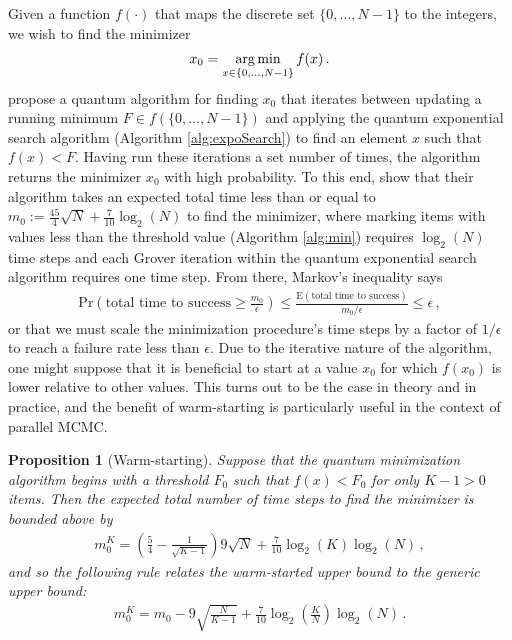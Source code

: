 \documentclass[12pt]{article} %
\newtheorem{prop}{Proposition}
\newcommand{\argmin}{\operatornamewithlimits{arg\,min}}
\begin{document}
Given a function $f(\cdot)$ that maps the discrete set $\{0,\dots,N-1\}$ to the integers, we wish to find the minimizer
\begin{align*}
x_0 = \argmin_{x\in\{0,\dots,N-1\}} f(x) \, .
\end{align*}
 \citet{durr1996quantum} propose a quantum algorithm for finding $x_0$ that iterates between updating a running minimum $F\in f(\{0,\dots,N-1\})$ and applying the quantum exponential search algorithm (Algorithm \ref{alg:expoSearch}) to find an element $x$ such that $f(x)<F$.  Having run these iterations a set number of times, the algorithm returns the minimizer $x_0$ with high probability. 
 To this end, \citet{durr1996quantum} show that their algorithm takes an expected total time less than or equal to $m_0:=\frac{45}{4}\sqrt{N}+\frac{7}{10}\log_2(N)$ to find the minimizer, where marking items with values less than the threshold value (Algorithm \ref{alg:min}) requires $\log_2(N)$ time steps and each Grover iteration within the quantum exponential search algorithm requires one time step. From there, Markov's inequality says
 \begin{align*}
 \mbox{Pr}\left( \mbox{total time to success} \geq \frac{m_0}{\epsilon}\right) \leq \frac{\mbox{E}\left(\mbox{total time to success}\right)}{m_0/\epsilon}\leq \epsilon \, ,
 \end{align*}
 or that we must scale the minimization procedure's time steps by a factor of $1/\epsilon$ to reach a failure rate less than $\epsilon$.  Due to the iterative nature of the algorithm, one might suppose that it is beneficial to start at a value $x_0$ for which $f(x_0)$ is lower relative to other values. This turns out to be the case in theory and in practice, and the benefit of warm-starting is particularly useful in the context of parallel MCMC.



\begin{prop}[Warm-starting]\label{prop:warm}
	Suppose that the quantum minimization algorithm begins with a threshold $F_0$ such that $f(x)<F_0$ for only $K-1>0$ items. Then the expected total number of time steps to find the minimizer is bounded above by
	\begin{align*}
	m_0^K = \left(\frac{5}{4} - \frac{1}{\sqrt{K-1}} \right) 9\sqrt{N} + \frac{7}{10} \log_2(K) \log_2(N) \, ,
	\end{align*}
	and so the following rule relates the warm-started upper bound to the generic upper bound:
	\begin{align*}
	m_0^K = m_0 - 9\sqrt{\frac{N}{K-1}} + \frac{7}{10} \log_2 \left(\frac{K}{N} \right) \log_2(N)\, .
	\end{align*} 
\end{prop}
\end{document}

